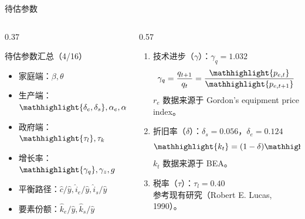 \documentclass[aspectratio=169,10pt]{beamer}
\begin{document}
\begin{frame}{待估参数}
  \begin{columns}[T,onlytextwidth]
    \begin{column}{0.37\linewidth}
      \begin{block}{待估参数汇总（4/16）}
        \begin{itemize}
          \setlength{\itemsep}{0.8em}
          \item 家庭端：${\beta}, {\theta}$
          \item 生产端：$\mathhighlight{\delta_e, \delta_s}, {\alpha_e}, {\alpha_s}$
          \item 政府端：$\mathhighlight{\tau_l}, \tau_k$
          \item 增长率：$\mathhighlight{\gamma_q}, \gamma_z, g$
          \item 平衡路径：$ {\hat{c}}/{\hat y}, {\hat{i}_e}/{\hat y}, {\hat{i}_s}/{\hat y} $
          \item 要素份额：$ {\hat{k}_e}/{\hat y}, {\hat{k}_s}/{\hat y} $
        \end{itemize}
      \end{block}
    \end{column}
    \begin{column}{0.57\linewidth}
      \vspace{1em}
      \begin{enumerate}
        \item[1.] 技术进步（$\gamma$）：$\gamma_q = 1.032$
              \begin{equation*}
                \gamma_q = \dfrac{q_{t+1}}{q_t} =  \dfrac{\mathhighlight{p_{e,t}}}{\mathhighlight{p_{e,t+1}}}
              \end{equation*}
              $r_{e}$ 数据来源于 Gordon's equipment price index。
        \item[2-3.] 折旧率（$\delta$）：$\delta_s = 0.056$，$\delta_e = 0.124$
              \begin{equation*}
                \mathhighlight{k_{t}} = (1-\delta) \mathhighlight{k_{t-1}}
              \end{equation*}
              $k_t$ 数据来源于 BEA。
        \item[4.] 税率（$\tau$）：$\tau_l = 0.40$ \\
              参考现有研究（Robert E. Lucas, 1990）。
      \end{enumerate}

    \end{column}
  \end{columns}

\end{frame}
\end{document}
